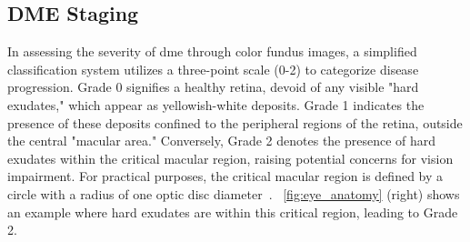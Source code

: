 \subsection{DME Staging}

In assessing the severity of \gls{dme} through color fundus images, a simplified classification system utilizes a three-point scale (0-2) to categorize disease progression. Grade 0 signifies a healthy retina, devoid of any visible "hard exudates," which appear as yellowish-white deposits. Grade 1 indicates the presence of these deposits confined to the peripheral regions of the retina, outside the central "macular area." Conversely, Grade 2 denotes the presence of hard exudates within the critical macular region, raising potential concerns for vision impairment. For practical purposes, the critical macular region is defined by a circle with a radius of one optic disc diameter~\cite{ren2018diabetic}. \fig~\ref{fig:eye_anatomy} (right) shows an example where hard exudates are within this critical region, leading to Grade 2.
